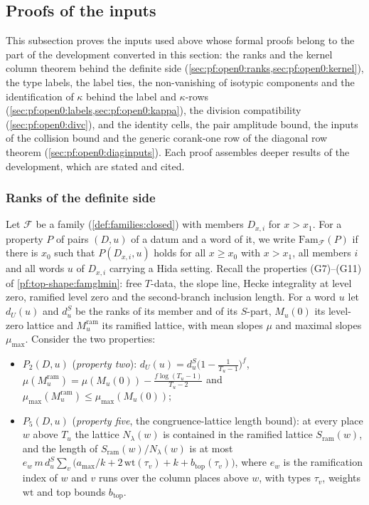 \subsection{Proofs of the inputs}\label{sec:pf:open0:inputs}

This subsection proves the inputs used above whose formal proofs belong to the part of the development converted in this
section: the ranks and the kernel column theorem behind the definite side (\cref{sec:pf:open0:ranks,sec:pf:open0:kernel}),
the type labels, the label ties, the non-vanishing of isotypic components and the identification of $\kappa$ behind the label
and $\kappa$-rows (\cref{sec:pf:open0:labels,sec:pf:open0:kappa}), the division compatibility (\cref{sec:pf:open0:divc}), and
the identity cells, the pair amplitude bound, the inputs of the collision bound and the generic corank-one row of the
diagonal row theorem (\cref{sec:pf:open0:diaginputs}). Each proof assembles deeper results of the development, which are
stated and cited.

\subsubsection{Ranks of the definite side}\label{sec:pf:open0:ranks}

Let $\mathcal F$ be a family (\cref{def:families:closed}) with members $D_{x,i}$ for $x>x_1$. For a property $P$ of pairs
$(D,u)$ of a datum and a word of it, we write $\mathrm{Fam}_{\mathcal F}(P)$ if there is $x_0$ such that $P(D_{x,i},u)$ holds for
all $x\ge x_0$ with $x>x_1$, all members $i$ and all words $u$ of $D_{x,i}$ carrying a Hida setting. Recall the properties
(G7)--(G11) of \cref{pf:top-shape:famglmin}: free $T$-data, the slope line, Hecke integrality at level zero, ramified level
zero and the second-branch inclusion length. For a word $u$ let $d_U(u)$ and $d^S_u$ be the ranks of its member and of its
$S$-part, $M_u(0)$ its level-zero lattice and $M_u^{\mathrm{ram}}$ its ramified lattice, with mean slopes $\mu$ and maximal
slopes $\mu_{\max}$. Consider the two properties:
\begin{itemize}
\item $P_2(D,u)$ (\emph{property two}): $d_U(u)=d^S_u\bigl(1-\frac1{T_u-1}\bigr)^f$,
$\mu(M_u^{\mathrm{ram}})=\mu(M_u(0))-\frac{f\log(T_u-1)}{T_u-2}$ and $\mu_{\max}(M_u^{\mathrm{ram}})\le\mu_{\max}(M_u(0))$;
\item $P_5(D,u)$ (\emph{property five}, the congruence-lattice length bound): at every place $w$ above $T_u$ the lattice
$N_\lambda(w)$ is contained in the ramified lattice $S_{\mathrm{ram}}(w)$, and the length of $S_{\mathrm{ram}}(w)/N_\lambda(w)$ is at
most $e_w\,m\,d^S_u\sum_v\bigl(a_{\max}/k+2\,\mathrm{wt}(\tau_v)+k+b_{\mathrm{top}}(\tau_v)\bigr)$, where $e_w$ is the ramification
index of $w$ and $v$ runs over the column places above $w$, with types $\tau_v$, weights $\mathrm{wt}$ and top bounds
$b_{\mathrm{top}}$.
\end{itemize}


